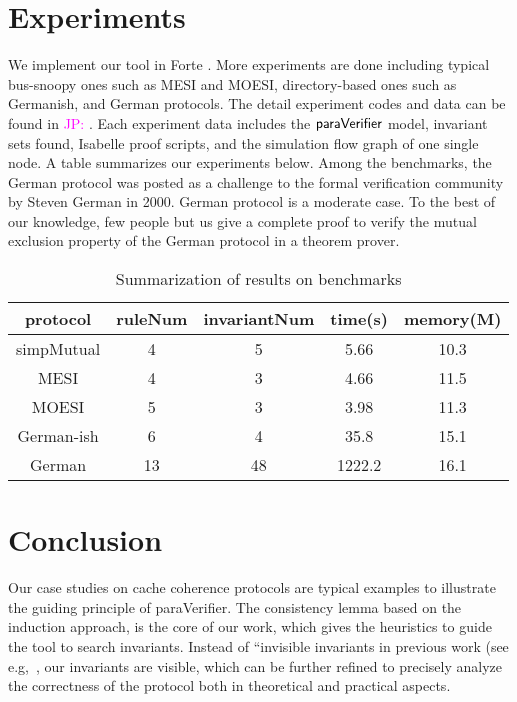 \documentclass{llncs}
\newcommand\JP[1]{\textcolor{magenta}{JP: #1}}
\begin{document}
\section{Experiments}
We implement our tool in Forte \cite{Forte}. More experiments are
done including typical bus-snoopy ones such as MESI and MOESI,
 directory-based ones such as  Germanish, and  German protocols. The detail experiment codes and data can
be found in \JP{\cite{LiCache14}}. Each experiment data includes the
${\sf paraVerifier}$ model, invariant sets found, Isabelle proof
scripts, and the simulation flow graph of one single node. A table
summarizes  our experiments below. Among the benchmarks, the German
protocol   was posted
 as
a challenge to the formal verification community by Steven German in
2000. German protocol is a moderate case.
To the best of our knowledge, few people but us give a complete proof to verify
the mutual exclusion  property of the German protocol
 in a theorem prover.

 \begin{table}[htbp] \label{Summarization of experiment results}
\centering \caption{Summarization of results on benchmarks}
\begin{tabular}{|c|c|c|c|c|}
\hline
protocol &  ruleNum & invariantNum & time(s) & memory(M) \\
\hline
simpMutual& 4& 5 & 5.66 & 10.3 \\
\hline
MESI & 4& 3 & 4.66 & 11.5  \\
\hline
MOESI &  5& 3 &3.98 & 11.3  \\
\hline
 German-ish  & 6& 4 &35.8 & 15.1   \\
\hline
German & 13 & 48 & 1222.2 & 16.1   \\
\hline
\end{tabular}
\end{table}

\section{Conclusion}
Our case studies on cache coherence protocols are typical examples
to illustrate the guiding principle of {\sf paraVerifier}. The
 consistency lemma based on the induction approach, is the
core of our work, which gives the heuristics to guide the tool
 to search invariants. Instead of ``invisible invariants in previous work
 (see e.g,~\cite{Pnueli2001}, our invariants are visible,
 which can be further refined to precisely
 analyze the correctness of the protocol both in theoretical and practical aspects.



\end{document}
